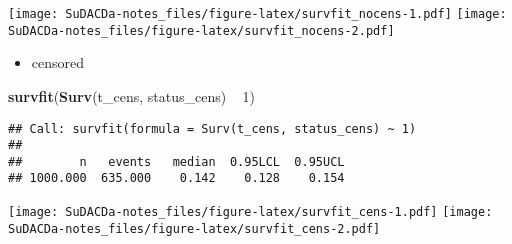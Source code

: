 \documentclass[]{book}
\newenvironment{Shaded}{\begin{snugshade}}{\end{snugshade}}
\newcommand{\KeywordTok}[1]{\textcolor[rgb]{0.13,0.29,0.53}{\textbf{{#1}}}}
\newcommand{\DataTypeTok}[1]{\textcolor[rgb]{0.13,0.29,0.53}{{#1}}}
\newcommand{\DecValTok}[1]{\textcolor[rgb]{0.00,0.00,0.81}{{#1}}}
\newcommand{\FloatTok}[1]{\textcolor[rgb]{0.00,0.00,0.81}{{#1}}}
\newcommand{\StringTok}[1]{\textcolor[rgb]{0.31,0.60,0.02}{{#1}}}
\newcommand{\OtherTok}[1]{\textcolor[rgb]{0.56,0.35,0.01}{{#1}}}
\newcommand{\NormalTok}[1]{{#1}}
\providecommand{\tightlist}{%
  \setlength{\itemsep}{0pt}\setlength{\parskip}{0pt}}
\theoremstyle{definition}
\theoremstyle{definition}
\theoremstyle{definition}
\theoremstyle{remark}
\begin{document}
\texttt{[image: SuDACDa-notes\_files/figure-latex/survfit\_nocens-1.pdf]}
\texttt{[image: SuDACDa-notes\_files/figure-latex/survfit\_nocens-2.pdf]}

\begin{itemize}
\tightlist
\item
  censored
\end{itemize}

\begin{Shaded}
\begin{Highlighting}[]
\KeywordTok{survfit}\NormalTok{(}\KeywordTok{Surv}\NormalTok{(t_cens, status_cens) ~}\StringTok{ }\DecValTok{1}\NormalTok{)}
\end{Highlighting}
\end{Shaded}

\begin{verbatim}
## Call: survfit(formula = Surv(t_cens, status_cens) ~ 1)
## 
##        n   events   median  0.95LCL  0.95UCL 
## 1000.000  635.000    0.142    0.128    0.154
\end{verbatim}

\begin{Shaded}
\end{Shaded}

\texttt{[image: SuDACDa-notes\_files/figure-latex/survfit\_cens-1.pdf]}
\texttt{[image: SuDACDa-notes\_files/figure-latex/survfit\_cens-2.pdf]}
\end{document}
